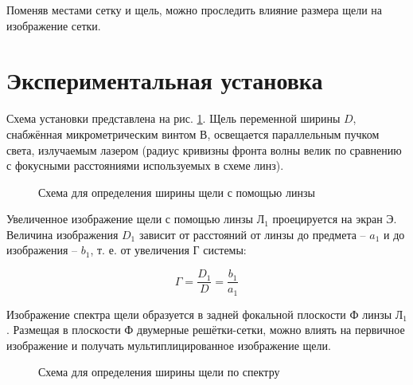 \documentclass[a5paper,10pt, twoside]{article} %
\begin{document}
		Поменяв местами сетку и щель, можно проследить влияние размера щели на изображение сетки.
		
\section{Экспериментальная установка}
	
	Схема установки представлена на рис. \ref{ris:ust}. Щель переменной ширины $D$, снабжённая 
	микрометрическим винтом В, освещается параллельным пучком света, излучаемым
	лазером (радиус кривизны фронта волны велик по сравнению с фокусными расстояниями используемых 
	в схеме линз).
	
	\begin{figure}[h]
		\caption{Схема для определения ширины щели с помощью линзы}
		\label{ris:ust}
	\end{figure}
	
	Увеличенное изображение щели с помощью линзы $\text{Л}_1$ проецируется на экран Э. Величина
	изображения $D_1$ зависит от расстояний от линзы до предмета -- $a_1$ и до изображения -- $b_1$, 
	т. е. от увеличения Г системы:
	
	\begin{equation}
		\Gamma = \frac{D_1}{D} = \frac{b_1}{a_1}
	\end{equation}
	
	Изображение спектра щели образуется в задней фокальной плоскости Ф линзы $\text{Л}_1$. Размещая в 
	плоскости Ф двумерные решётки-сетки, можно влиять на первичное изображение и получать 
	мультиплицированное изображение щели.
	
	\begin{figure}[h]
		\caption{Схема для определения ширины щели по спектру}
		\label{ris:spectrum}
	\end{figure}
	
\end{document}
